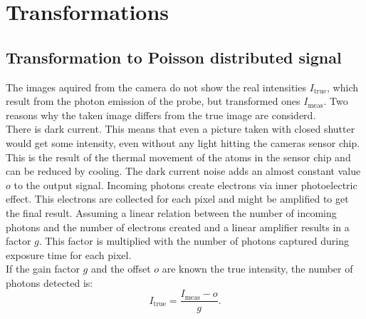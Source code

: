 \section{Transformations}
\subsection{Transformation to Poisson distributed signal} \label{trafoPoiss}
The images aquired from the camera do not show the real intensities
$I_\text{true}$, which result from the photon emission of the probe, but
transformed ones $I_\text{meas}$. Two reasons why the taken image
differs from the true image are considerd.\\
There is dark current. This means that even a picture taken with closed shutter
would get some intensity, even without any light hitting the cameras sensor chip. This is the result of the thermal movement of the atoms in the sensor chip
and can be reduced by cooling. The dark current noise adds an almost constant
value $o$ to the output signal.
Incoming photons create electrons via inner photoelectric effect. This electrons
are collected for each pixel and might be amplified to get the final result.
Assuming a linear relation between the number of incoming photons and the number
of electrons created and a linear amplifier results in a factor $g$. This factor
is multiplied with the number of photons captured during exposure time for each
pixel.\\
If the gain factor $g$ and the offset $o$ are known the true intensity, the
number of photons detected is:
\begin{equation}
	I_\text{true} = \dfrac{I_\text{meas}-o}{g}. \label{transtopoiss}
\end{equation}
